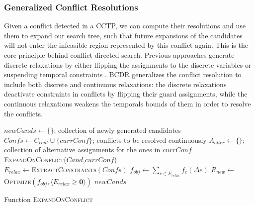 \documentclass[jair,twoside,11pt,theapa]{article}
\let\oldnl\nl%
\newcommand{\nonl}{\renewcommand{\nl}{\let\nl\oldnl}}%
\begin{document}
\subsubsection{Generalized Conflict Resolutions}

Given a conflict detected in a CCTP, we can compute their resolutions and use
them to expand our search tree, such that future expansions of the candidates
will not enter the infeasible region represented by this conflict again. This is
the core principle behind conflict-directed search. Previous approaches generate
discrete relaxations by either flipping the assignments to the discrete
variables \cite{Williams_CDAstar_2002,Bailey_DAA_2005} or suspending temporal
constraints \cite{Moffitt_PCS_2005a}. BCDR generalizes the conflict resolution
to include both discrete and continuous relaxations: the discrete relaxations
deactivate constraints in conflicts by flipping their guard assignments, while
the continuous relaxations weakens the temporals bounds of them in order to
resolve the conflicts.


\begin{algorithm}[h!]
	\SetAlgoLined
	\Indm
	\Initialize{}
	\Indp
	{$\mathit{newCands}\leftarrow \{\}$}; collection of newly generated candidates\;
	{$\mathit{Confs}\leftarrow C_{cont}\cup \{\mathit{currConf}\}$; conflicts to be resolved
		continuously}\;
	{$A_{alter}\leftarrow \{\}$}; collection of alternative assignments for the ones in $\mathit{currConf}$\;
	\Indm
	\Algorithm{}
	\nonl\textsc{ExpandOnConflict}($\mathit{Cand}$,$\mathit{currConf}$)\\
	\Indp
	$E_{relax}\leftarrow$\textsc{ExtractConstraints}$(\mathit{Confs})$\;
	$f_{obj}\leftarrow\sum_{e\in E_{relax}}f_e(\Delta e)$\;
	$R_{new}\leftarrow$\textsc{Optimize}$(f_{obj},\langle
	E_{relax}\geq \textbf{0}\rangle )$\;
	\Return $\mathit{newCands}$\;
	\caption{Function \textsc{ExpandOnConflict}}
	\label{alg:ExpandOnConflict}
\end{algorithm}
\end{document}
